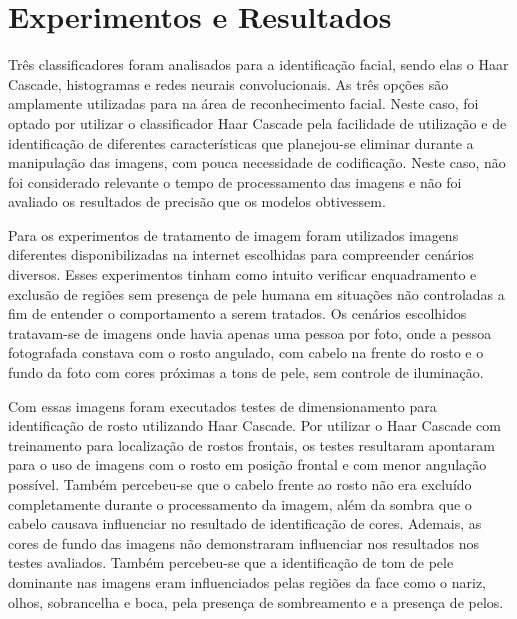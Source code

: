 \chapter{Experimentos e Resultados}
\label{cap:experimentos-resultados}

Três classificadores foram analisados para a identificação facial, sendo elas o Haar Cascade, histogramas e redes neurais convolucionais. As três opções são amplamente utilizadas para na área de reconhecimento facial. Neste caso, foi optado por utilizar o classificador Haar Cascade pela facilidade de utilização e de identificação de diferentes características que planejou-se eliminar durante a manipulação das imagens, com pouca necessidade de codificação. Neste caso, não foi considerado relevante o tempo de processamento das imagens e não foi avaliado os resultados de precisão que os modelos obtivessem. 

Para os experimentos de tratamento de imagem foram utilizados imagens diferentes disponibilizadas na internet escolhidas para compreender cenários diversos. Esses experimentos tinham como intuito verificar enquadramento e exclusão de regiões sem presença de pele humana em situações não controladas a fim de entender o comportamento a serem tratados. Os cenários escolhidos tratavam-se de imagens onde havia apenas uma pessoa por foto, onde a pessoa fotografada constava com o rosto angulado, com cabelo na frente do rosto e o fundo da foto com cores próximas a tons de pele, sem controle de iluminação. 

Com essas imagens foram executados testes de dimensionamento para identificação de rosto utilizando Haar Cascade. Por utilizar o Haar Cascade com treinamento para localização de rostos frontais, os testes resultaram apontaram para o uso de imagens com o rosto em posição frontal e com menor angulação possível. Também percebeu-se que o cabelo frente ao rosto não era excluído completamente durante o processamento da imagem, além da sombra que o cabelo causava influenciar no resultado de identificação de cores. Ademais, as cores de fundo das imagens não demonstraram influenciar nos resultados nos testes avaliados. Também percebeu-se que a identificação de tom de pele dominante nas imagens eram influenciados pelas regiões da face como o nariz, olhos, sobrancelha e boca, pela presença de sombreamento e a presença de pelos. 

